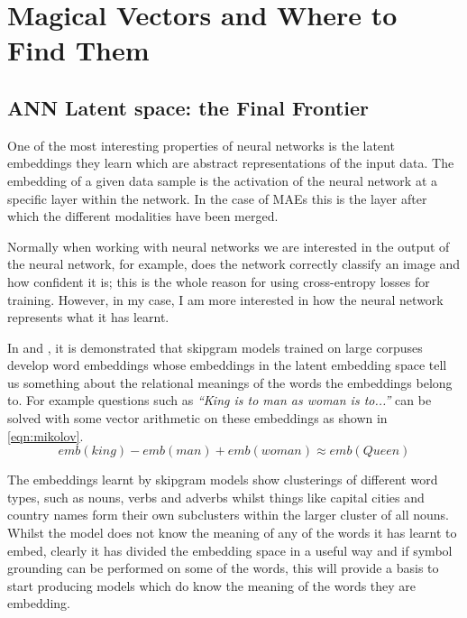 
\chapter{Magical Vectors and Where to Find Them} %

\label{Chapter5} %


\section{ANN Latent space: the Final Frontier}
One of the most interesting properties of neural networks is the latent embeddings they learn which are abstract representations of the input data. The embedding of a given data sample is the activation of the neural network at a specific layer within the network. In the case of MAEs this is the layer after which the different modalities have been merged.

Normally when working with neural networks we are interested in the output of the neural network, for example, does the network correctly classify an image and how confident it is; this is the whole reason for using cross-entropy losses for training. However, in my case, I am more interested in how the neural network represents what it has learnt.

In \cite{mikolov2013distributed} and \cite{mikolov2013efficient}, it is demonstrated that skipgram models trained on large corpuses develop word embeddings whose embeddings in the latent embedding space tell us something about the relational meanings of the words the embeddings belong to. For example questions such as \textit{``King is to man as woman is to...''} can be solved with some vector arithmetic on these embeddings as shown in \autoref{eqn:mikolov}.
\begin{equation}
emb(king) - emb(man) + emb(woman) \approx emb(Queen)
\label{eqn:mikolov}
\end{equation} 

The embeddings learnt by skipgram models show clusterings of different word types, such as nouns, verbs and adverbs whilst things like capital cities and country names form their own subclusters within the larger cluster of all nouns. Whilst the model does not know the meaning of any of the words it has learnt to embed, clearly it has divided the embedding space in a useful way and if symbol grounding can be performed on some of the words, this will provide a basis to start producing models which do know the meaning of the words they are embedding.

